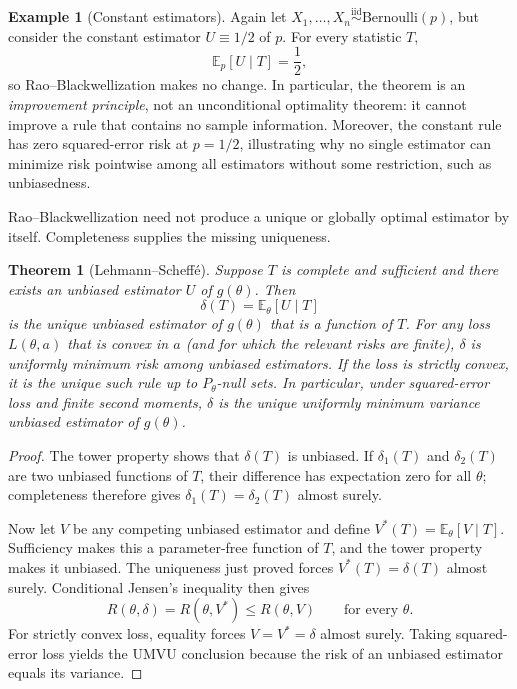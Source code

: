 \documentclass[12pt,oneside]{book}
\numberwithin{equation}{section}
\theoremstyle{definition}
\newtheorem{example}{Example}[section]
\theoremstyle{plain}
\newtheorem{theorem}{Theorem}[section]
\theoremstyle{remark}
\newcommand{\E}{\mathbb{E}}
\newcommand{\iid}{\overset{\text{iid}}{\sim}}
\newcommand{\Bern}{\mathrm{Bernoulli}}
\begin{document}
\begin{example}[Constant estimators]
Again let $X_1,\ldots,X_n\iid\Bern(p)$, but consider the constant estimator
$U\equiv 1/2$ of $p$.  For every statistic $T$,
\[
    \E_p[U\mid T]=\frac12,
\]
so Rao--Blackwellization makes no change.  In particular, the theorem is an
\emph{improvement principle}, not an unconditional optimality theorem: it
cannot improve a rule that contains no sample information.  Moreover, the
constant rule has zero squared-error risk at $p=1/2$, illustrating why no
single estimator can minimize risk pointwise among all estimators without
some restriction, such as unbiasedness.
\end{example}

Rao--Blackwellization need not produce a unique or globally optimal estimator
by itself.  Completeness supplies the missing uniqueness.

\begin{theorem}[Lehmann--Scheff\'e]
Suppose $T$ is complete and sufficient and there exists an unbiased
estimator $U$ of $g(\theta)$.  Then
\[
    \delta(T)=\E_\theta[U\mid T]
\]
is the unique unbiased estimator of $g(\theta)$ that is a function of $T$.
For any loss $L(\theta,a)$ that is convex in $a$ (and for which the relevant
risks are finite), $\delta$ is uniformly minimum risk among unbiased
estimators.  If the loss is strictly convex, it is the unique such rule up to
$P_\theta$-null sets.  In particular, under squared-error loss and finite
second moments, $\delta$ is the unique uniformly minimum variance unbiased
estimator of $g(\theta)$.
\end{theorem}

\begin{proof}
The tower property shows that $\delta(T)$ is unbiased.  If $\delta_1(T)$ and
$\delta_2(T)$ are two unbiased functions of $T$, their difference has
expectation zero for all $\theta$; completeness therefore gives
$\delta_1(T)=\delta_2(T)$ almost surely.

Now let $V$ be any competing unbiased estimator and define
$V^*(T)=\E_\theta[V\mid T]$.  Sufficiency makes this a parameter-free
function of $T$, and the tower property makes it unbiased.  The uniqueness
just proved forces $V^*(T)=\delta(T)$ almost surely.  Conditional Jensen's
inequality then gives
\[
 R(\theta,\delta)=R(\theta,V^*)\leq R(\theta,V)
 \qquad\text{for every }\theta.
\]
For strictly convex loss, equality forces $V=V^*=\delta$ almost surely.
Taking squared-error loss yields the UMVU conclusion because the risk of an
unbiased estimator equals its variance.
\end{proof}
\end{document}
